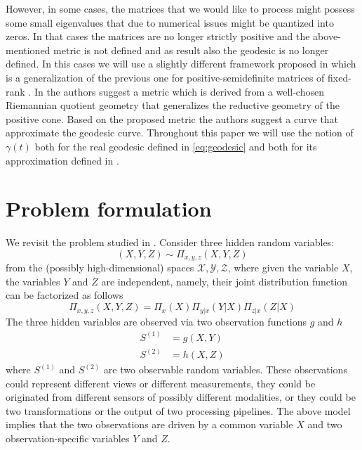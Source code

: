 \documentclass[]{article}
\theoremstyle{definition}
\begin{document}
	However, in some cases, the matrices that we would like to process might possess some small eigenvalues that due to numerical issues might be quantized into zeros. In that cases the matrices are no longer strictly positive and the above-mentioned metric is not defined and as result also the geodesic is no longer defined.
	In this cases we will use a slightly different framework proposed in \cite{bonnabel2009riemannian} which is a generalization of the previous one for positive-semidefinite matrices of fixed-rank .
	In \cite{bonnabel2009riemannian} the authors suggest a metric which is derived from a well-chosen Riemannian quotient geometry that generalizes the reductive geometry of the positive cone. Based on the proposed metric the authors suggest a curve that approximate the geodesic curve. Throughout this paper we will use the notion of $\gamma(t)$ both for the real geodesic defined in \ref{eq:geodesic} and both for its approximation defined in \cite[equation 14]{bonnabel2009riemannian}.
	
	
\section{Problem formulation}
\label{sec:ProposedMethod}

We revisit the problem studied in \cite{lederman2018learning}. 
Consider three hidden random variables:
\begin{equation*}
	(X,Y,Z) \sim \Pi_{x,y,z}(X,Y,Z)
\end{equation*}
from the (possibly high-dimensional) spaces $\mathcal{X,Y,Z}$, where given the variable $X$, the variables $Y$ and $Z$ are independent, namely, their joint distribution function can be factorized as follows
\begin{equation*}
	\Pi_{x,y,z}(X,Y,Z) = \Pi _x (X) \Pi_{y|x}(Y|X)\Pi_{z|x}(Z|X)
\end{equation*}
The three hidden variables are observed via two observation functions $g$ and $h$
\begin{align}
	S^{(1)} &= g(X,Y)\\
	S^{(2)} &= h(X,Z)
\end{align} 
where $S^{(1)}$ and $S^{(2)}$ are two observable random variables.
These observations could represent different views or different measurements, they could be originated from different sensors of possibly different modalities, or they could be two transformations or the output of two processing pipelines.
%
The above model implies that the two observations are driven by a common variable $X$ and two observation-specific variables $Y$ and $Z$.
\end{document}
